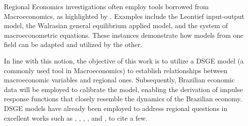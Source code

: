 \documentclass[../thesis.tex]{subfiles}
\begin{document}

Regional Economics investigations often employ tools borrowed from Macroeconomics, as highlighted by \textcite{rickman_modern_2010}. Examples include the Leontief input-output model, the Walrasian general equilibrium applied model, and the system of macroeconometric equations. These instances demonstrate how models from one field can be adapted and utilized by the other.

In line with this notion, the objective of this work is to utilize a DSGE model (a commonly used tool in Macroeconomics) to establish relationships between macroeconomic variables and regional ones. Subsequently, Brazilian economic data will be employed to calibrate the model, enabling the derivation of impulse response functions that closely resemble the dynamics of the Brazilian economy. DSGE models have already been employed to address regional questions in excellent works such as \textcite{tamegawa_two-region_2012}, \textcite{tamegawa_constructing_2013}, \textcite{mora_fdi_2019}, \textcite{costa_junior_dsge_2022}, and \textcite{osterno_uma_2022}, to cite a few.


\end{document}
